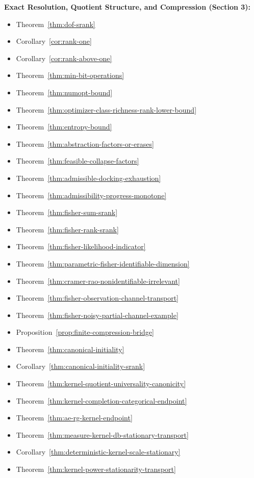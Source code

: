 \textbf{Exact Resolution, Quotient Structure, and Compression (Section 3):}
\begin{itemize}
\item Theorem~\ref{thm:dof-srank}
\item Corollary~\ref{cor:rank-one}
\item Corollary~\ref{cor:rank-above-one}
\item Theorem~\ref{thm:min-bit-operations}
\item Theorem~\ref{thm:numopt-bound}
\item Theorem~\ref{thm:optimizer-class-richness-rank-lower-bound}
\item Theorem~\ref{thm:entropy-bound}
\item Theorem~\ref{thm:abstraction-factors-or-erases}
\item Theorem~\ref{thm:feasible-collapse-factors}
\item Theorem~\ref{thm:admissible-docking-exhaustion}
\item Theorem~\ref{thm:admissibility-progress-monotone}
\item Theorem~\ref{thm:fisher-sum-srank}
\item Theorem~\ref{thm:fisher-rank-srank}
\item Theorem~\ref{thm:fisher-likelihood-indicator}
\item Theorem~\ref{thm:parametric-fisher-identifiable-dimension}
\item Theorem~\ref{thm:cramer-rao-nonidentifiable-irrelevant}
\item Theorem~\ref{thm:fisher-observation-channel-transport}
\item Theorem~\ref{thm:fisher-noisy-partial-channel-example}
\item Proposition~\ref{prop:finite-compression-bridge}
\item Theorem~\ref{thm:canonical-initiality}
\item Corollary~\ref{thm:canonical-initiality-srank}
\item Theorem~\ref{thm:kernel-quotient-universality-canonicity}
\item Theorem~\ref{thm:kernel-completion-categorical-endpoint}
\item Theorem~\ref{thm:ae-rg-kernel-endpoint}
\item Theorem~\ref{thm:measure-kernel-db-stationary-transport}
\item Corollary~\ref{thm:deterministic-kernel-scale-stationary}
\item Theorem~\ref{thm:kernel-power-stationarity-transport}

\end{itemize}
